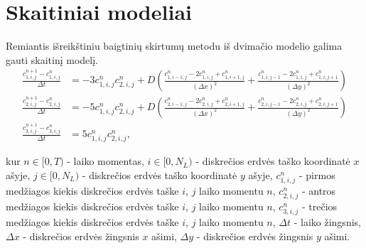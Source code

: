 \documentclass{article}
\begin{document}
\newpage
\section{Skaitiniai modeliai}

Remiantis išreikštiniu baigtinių skirtumų metodu iš dvimačio modelio galima gauti skaitinį modelį.
\begin{subequations} \label{numerical-eqs}
\begin{align}
\frac{c^{n+1}_{1,i,j}-c^n_{1,i,j}}{\Delta t}&=
-3c^{n}_{1,i,j}c^{n}_{2,i,j}
+D\left(\frac{c^n_{1,i-1,j}-2c^n_{1,i,j}+c^n_{1,i+1,j}}{(\Delta x)^2}+\frac{c^n_{1,i,j-1}-2c^n_{1,i,j}+c^n_{1,i,j+1}}{(\Delta y)^2}\right)\\
\frac{c^{n+1}_{2,i,j}-c^n_{2,i,j}}{\Delta t}&=
-5c^{n}_{1,i,j}c^{n}_{2,i,j}
+D\left(\frac{c^n_{2,i-1,j}-2c^n_{2,i,j}+c^n_{2,i+1,j}}{(\Delta x)^2}+\frac{c^n_{2,i,j-1}-2c^n_{2,i,j}+c^n_{2,i,j+1}}{(\Delta y)^2}\right)\\
\frac{c^{n+1}_{3,i,j}-c^n_{3,i,j}}{\Delta t}&=5c^{n}_{1,i,j}c^{n}_{2,i,j},
\end{align}
\end{subequations}

kur $n\in[0, T)$ - laiko momentas, 
$i\in[0,N_L)$ - diskrečios erdvės taško koordinatė $x$ ašyje,
$j\in[0,N_L)$ - diskrečios erdvės taško koordinatė $y$ ašyje,
$c^n_{1,i,j}$ - pirmos medžiagos kiekis diskrečios erdvės taške $i$, $j$ laiko momentu $n$,
$c^n_{2,i,j}$ - antros medžiagos kiekis diskrečios erdvės taške $i$, $j$ laiko momentu $n$,
$c^n_{3,i,j}$ - trečios medžiagos kiekis diskrečios erdvės taške $i$, $j$ laiko momentu $n$,
$\Delta t$ - laiko žingsnis,
$\Delta x$ - diskrečios erdvės žingsnis $x$ ašimi,
$\Delta y$ - diskrečios erdvės žingsnis $y$ ašimi.
\end{document}
